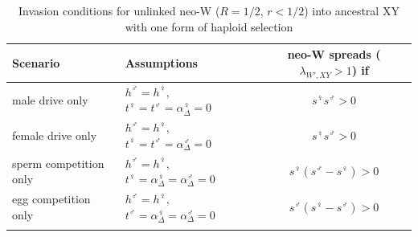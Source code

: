 \documentclass[12pt]{article}
\begin{document}
\begin{table}[ht]
\centering
\smallskip
\caption{Invasion conditions for unlinked neo-W ($R=1/2$, $r<1/2$) into ancestral XY with one form of haploid selection}
\begin{tabular}{l l c }
\hline\hline
Scenario &  Assumptions & neo-W spreads ($\lambda_{W',XY}>1$) if \\ [0.5ex] \hline
  male drive only & $h^\male=h^\female$, $t^\female=t^\male=\alpha^\female_{\Delta}=0$ & $s^\female s^\male>0$ \\
 female drive only & $h^\male=h^\female$, $t^\female=t^\male=\alpha^\male_{\Delta}=0$ & $s^\female s^\male>0$ \\
 sperm competition only &  $h^\male=h^\female$, $t^\female=\alpha^\female_{\Delta}=\alpha^\male_{\Delta}=0$ & $s^\female(s^\male-s^\female)>0$ \\
  egg competition only & $h^\male=h^\female$, $t^\male=\alpha^\female_{\Delta}=\alpha^\male_{\Delta}=0$ & $s^\male(s^\female-s^\male)>0$ \\
  \hline \hline
  \label{tab:specialcases}
 \end{tabular}
\end{table}




\end{document}
